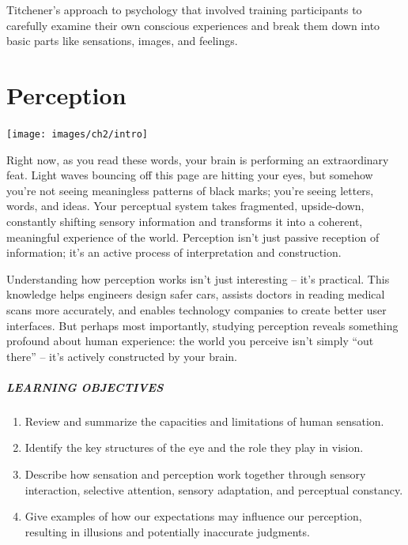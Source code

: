 \documentclass[
]{krantz}
\providecommand{\tightlist}{%
  \setlength{\itemsep}{0pt}\setlength{\parskip}{0pt}}
\begin{document}
Titchener's approach to psychology that involved training participants to carefully examine their own conscious experiences and break them down into basic parts like sensations, images, and feelings.

\chapter{Perception}\label{perception}

\begin{center}\texttt{[image: images/ch2/intro]} \end{center}

Right now, as you read these words, your brain is performing an extraordinary feat. Light waves bouncing off this page are hitting your eyes, but somehow you're not seeing meaningless patterns of black marks; you're seeing letters, words, and ideas. Your perceptual system takes fragmented, upside-down, constantly shifting sensory information and transforms it into a coherent, meaningful experience of the world. Perception isn't just passive reception of information; it's an active process of interpretation and construction.

Understanding how perception works isn't just interesting -- it's practical. This knowledge helps engineers design safer cars, assists doctors in reading medical scans more accurately, and enables technology companies to create better user interfaces. But perhaps most importantly, studying perception reveals something profound about human experience: the world you perceive isn't simply ``out there'' -- it's actively constructed by your brain.

\paragraph*{LEARNING OBJECTIVES}\label{learning-objectives-1}

\begin{enumerate}
\def\labelenumi{\arabic{enumi}.}
\tightlist
\item
  Review and summarize the capacities and limitations of human sensation.
\item
  Identify the key structures of the eye and the role they play in vision.
\item
  Describe how sensation and perception work together through sensory interaction, selective attention, sensory adaptation, and perceptual constancy.
\item
  Give examples of how our expectations may influence our perception, resulting in illusions and potentially inaccurate judgments.
\end{enumerate}
\end{document}
